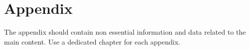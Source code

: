 \chapter{Appendix}

The appendix should contain non essential information and data related to the main content.
Use a dedicated chapter for each appendix.
